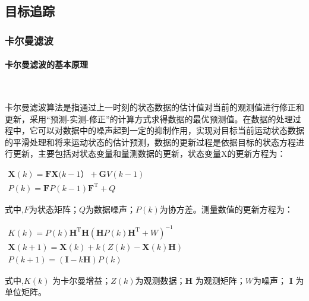 \pagestyle{plain}

\subsection{\textbf{目标追踪}}
\subsubsection{卡尔曼滤波}
\paragraph{卡尔曼滤波的基本原理}~{}

        卡尔曼滤波算法是指通过上一时刻的状态数据的估计值对当前的观测值进行修正和更新，采用“预测-实测-修正”的计算方式求得数据的最优预测值。在数据的处理过程中，它可以对数据中的噪声起到一定的抑制作用，实现对目标当前运动状态数据的平滑处理和将来运动状态的估计预测，数据的更新过程是依据目标的状态方程进行更新，主要包括对状态变量和量测数据的更新，状态变量X的更新方程为：
    
                 \begin{center}
                     $\begin{array}{r}\boldsymbol{X}(k)=\boldsymbol{F} \boldsymbol{X}(k-1）+\boldsymbol{G} V(k-1) \\P(k)=\boldsymbol{F} P(k-1) \boldsymbol{F}^{\mathrm{T}}+Q\end{array}$
                 \end{center}
                 
\begin{flushleft}
式中,$F$为状态矩阵；$Q$为数据噪声；$P(k)$为协方差。测量数值的更新方程为：
\end{flushleft}

                \begin{center}
                    $\begin{array}{c}K(k)=P(k) \boldsymbol{H}^{\mathrm{T}} \boldsymbol{H}\left(\boldsymbol{H} P(k) \boldsymbol{H}^{\mathrm{T}}+W\right)^{-1} \\\boldsymbol{X}(k+1)=\boldsymbol{X}(k)+k(Z(k)-\boldsymbol{X}(k) \boldsymbol{H}) \\P(k+1)=(\boldsymbol{I}-k \boldsymbol{H}) P(k)\end{array}$        
                \end{center}
                
\begin{flushleft}
    式中,$K(k)$ 为卡尔曼增益；$Z(k)$为观测数据；$\boldsymbol{H}$ 为观测矩阵；$W$为噪声； $\boldsymbol{I}$ 为单位矩阵。
\end{flushleft}
